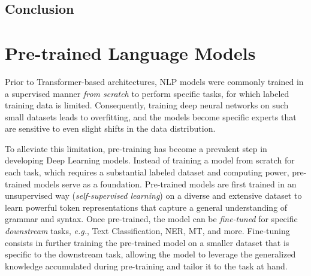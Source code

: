 
\subsection{Conclusion}


\section{Pre-trained Language Models}

Prior to Transformer-based architectures, \ac{NLP} models were commonly trained in a supervised manner \textit{from scratch} to perform specific tasks, for which labeled training data is limited. Consequently, training deep neural networks on such small datasets leads to overfitting, and the models become specific experts that are sensitive to even slight shifts in the data distribution. 


To alleviate this limitation, pre-training has become a prevalent step in developing Deep Learning models. Instead of training a model from scratch for each task, which requires a substantial labeled dataset and computing power, pre-trained models serve as a foundation. Pre-trained models are first trained in an unsupervised way (\textit{self-supervised learning}) on a diverse and extensive dataset to learn powerful token representations that capture a general understanding of grammar and syntax. Once pre-trained, the model can be \textit{fine-tuned} for specific \textit{downstream} tasks, \textit{e.g.}, Text Classification, \ac{NER}, \ac{MT}, and more. Fine-tuning consists in further training the pre-trained model on a smaller dataset that is specific to the downstream task, allowing the model to leverage the generalized knowledge accumulated during pre-training and tailor it to the task at hand.


